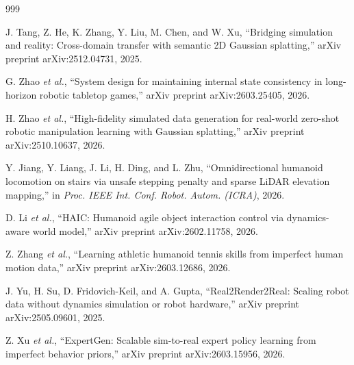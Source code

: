 \documentclass[11pt,a4paper]{article}
\begin{document}
\begin{thebibliography}{999}

J. Tang, Z. He, K. Zhang, Y. Liu, M. Chen, and W. Xu, ``Bridging simulation and reality: Cross-domain transfer with semantic 2D Gaussian splatting,'' arXiv preprint arXiv:2512.04731, 2025.




G. Zhao \textit{et al.}, ``System design for maintaining internal state consistency in long-horizon robotic tabletop games,'' arXiv preprint arXiv:2603.25405, 2026.




H. Zhao \textit{et al.}, ``High-fidelity simulated data generation for real-world zero-shot robotic manipulation learning with Gaussian splatting,'' arXiv preprint arXiv:2510.10637, 2026.




Y. Jiang, Y. Liang, J. Li, H. Ding, and L. Zhu, ``Omnidirectional humanoid locomotion on stairs via unsafe stepping penalty and sparse LiDAR elevation mapping,'' in \textit{Proc. IEEE Int. Conf. Robot. Autom. (ICRA)}, 2026.




D. Li \textit{et al.}, ``{HAIC}: Humanoid agile object interaction control via dynamics-aware world model,'' arXiv preprint arXiv:2602.11758, 2026.




Z. Zhang \textit{et al.}, ``Learning athletic humanoid tennis skills from imperfect human motion data,'' arXiv preprint arXiv:2603.12686, 2026.




J. Yu, H. Su, D. Fridovich-Keil, and A. Gupta, ``{Real2Render2Real}: Scaling robot data without dynamics simulation or robot hardware,'' arXiv preprint arXiv:2505.09601, 2025.




Z. Xu \textit{et al.}, ``{ExpertGen}: Scalable sim-to-real expert policy learning from imperfect behavior priors,'' arXiv preprint arXiv:2603.15956, 2026.




\end{thebibliography}
\end{document}
